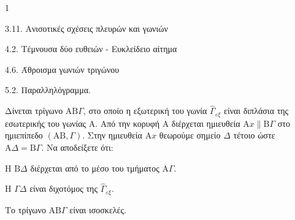 \begin{ylh}{1}
    \item 3.11. Ανισοτικές σχέσεις πλευρών και γωνιών
    \item 4.2. Τέμνουσα δύο ευθειών - Ευκλείδειο αίτημα
    \item 4.6. Άθροισμα γωνιών τριγώνου
    \item 5.2. Παραλληλόγραμμα.
\end{ylh}
Δίνεται τρίγωνο $\mathrm{A}\mathrm{B}\Gamma$, στο οποίο η εξωτερική του γωνία $\hat{\Gamma}_{\varepsilon\xi}$ είναι διπλάσια της εσωτερικής του γωνίας $\hat{\mathrm{A}}$. Από την κορυφή $\mathrm{A}$ διέρχεται ημιευθεία $\mathrm{A}x \parallel \mathrm{B}\Gamma$ στο ημιεπίπεδο $(\mathrm{A}\mathrm{B}, \Gamma)$. Στην ημιευθεία $\mathrm{A}x$ θεωρούμε σημείο $\Delta$ τέτοιο ώστε $\mathrm{A}\Delta = \mathrm{B}\Gamma$. Να αποδείξετε ότι:
\begin{alist}
    \item Η $\mathrm{B}\Delta$ διέρχεται από το μέσο του τμήματος $\mathrm{A}\Gamma$. 
    \item Η $\Gamma\Delta$ είναι διχοτόμος της $\hat{\Gamma}_{\varepsilon\xi}$. 
    \item Το τρίγωνο $\mathrm{A}\mathrm{B}\Gamma$ είναι ισοσκελές. 
\end{alist}
